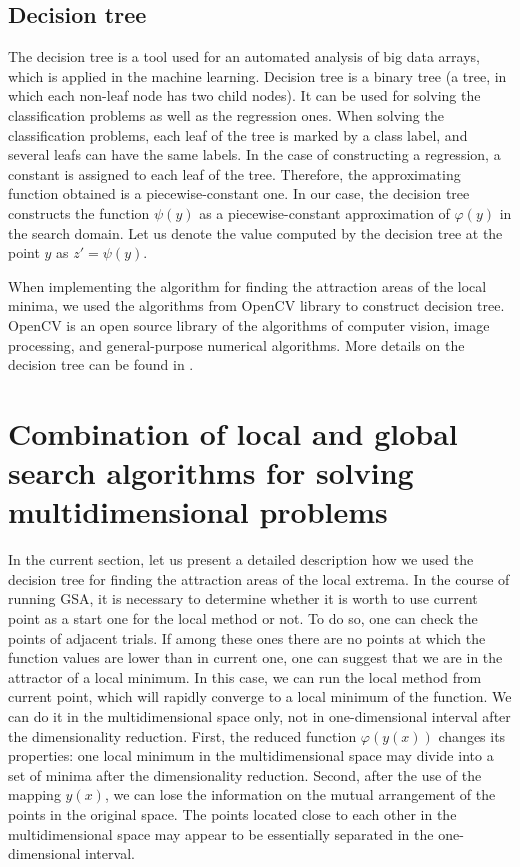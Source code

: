 \documentclass{svproc}
\begin{document}
\subsection{Decision tree}\label{SecDT}

The decision tree is a tool used for an automated analysis of big data arrays, which is applied in the  machine learning. Decision tree is a binary tree (a tree, in which each non-leaf node has two child nodes). It can be used for solving the classification problems as well as the regression ones. When solving  the classification problems, each leaf of the tree is marked by a class label, and several leafs can have  the same labels. In the case of constructing a regression, a constant is assigned to each leaf of the tree.   Therefore, the approximating function obtained is a piecewise-constant one. In our case, the decision tree constructs the function $\psi(y)$ as a piecewise-constant  approximation of $\varphi(y)$ in the search domain. Let us denote the value  computed by the  decision tree at the point $y$ as $z' = \psi(y)$.

When implementing the algorithm for finding the attraction areas of the local  minima, we used the algorithms from OpenCV library to construct decision tree. OpenCV is an open source library of the algorithms of computer vision, image processing, and  general-purpose numerical algorithms. More details on the decision tree can be found  in \cite{Brahmbhatt2013}.

\section{Combination of local and global search algorithms for solving multidimensional  problems}\label{SecGSAL}

In the current section, let us present a detailed description how we used the decision tree for finding  the attraction areas of the local extrema.  In the course of running GSA, it is necessary to determine whether it is worth to use current point as a  start one for the local method or not. To do so, one can check the points of adjacent trials. If among  these ones there are no points at which the function values are lower than in current one, one  can suggest that we are in the attractor of a local minimum. In this case, we can run the local method  from current point, which will rapidly converge to a local minimum of the function.  We can do it in the multidimensional space only, not in one-dimensional interval after the  dimensionality reduction.  First, the reduced function $\varphi(y(x))$ changes its properties: one local minimum in the  multidimensional space may divide into a set of minima after the dimensionality reduction.  Second, after the use of the mapping $y(x)$, we can lose the information on the mutual arrangement of  the points in the original space. The points located close to each other in the multidimensional space  may appear to be essentially separated in the one-dimensional interval.
\end{document}
